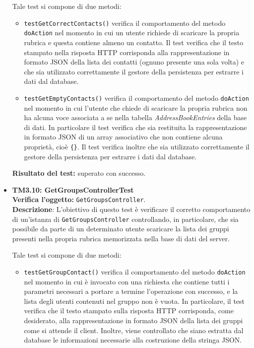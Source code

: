 \begin{itemize}
Tale test si compone di due metodi:
\begin{itemize}
\item \texttt{testGetCorrectContacts()} verifica il comportamento del metodo \texttt{doAction} nel momento in cui un utente richiede di scaricare la propria rubrica e questa contiene almeno un contatto. Il test verifica che il testo stampato nella risposta HTTP corrisponda alla rappresentazione in formato JSON della lista dei contatti (ognuno presente una sola volta) e che sia utilizzato correttamente il gestore della persistenza per estrarre i dati dal database.

\item \texttt{testGetEmptyContacts()} verifica il comportamento del metodo \texttt{doAction} nel momento in cui l'utente che chiede di scaricare la propria rubrica non ha alcuna voce associata a se nella tabella \textit{AddressBookEntries} della base di dati. In particolare il test verifica che sia restituita la rappresentazione in formato JSON di un array associativo che non contiene alcuna proprietà, cioè \texttt{\{\}}. Il test verifica inoltre che sia utilizzato correttamente il gestore della persistenza per estrarre i dati dal database.
\end{itemize}
\textbf{Risultato del test:} superato con successo.


\item \textbf{TM3.10: GetGroupsControllerTest}\\
\textbf{Verifica l'oggetto:} \texttt{GetGroupsController}.\\
\textbf{Descrizione}: L'obiettivo di questo test è verificare il corretto comportamento di un'istanza di \texttt{GetGroupsController} controllando, in particolare, che sia possibile da parte di un determinato utente scaricare la lista dei gruppi presenti nella propria rubrica memorizzata nella base di dati del server.

Tale test si compone di due metodi:
\begin{itemize}

\item \texttt{testGetGroupContact()} verifica il comportamento del metodo \texttt{doAction} nel momento in cui è invocato con una richiesta che contiene tutti i parametri necessari a portare a termine l'operazione con successo, e la lista degli utenti contenuti nel gruppo non è vuota. In particolare, il test verifica che il testo stampato sulla risposta HTTP corrisponda, come desiderato, alla rappresentazione in formato JSON della lista dei gruppi come si attende il client. Inoltre, viene controllato che siano estratta dal database le informazioni necessarie alla costruzione della stringa JSON.


\end{itemize}
\end{itemize}
